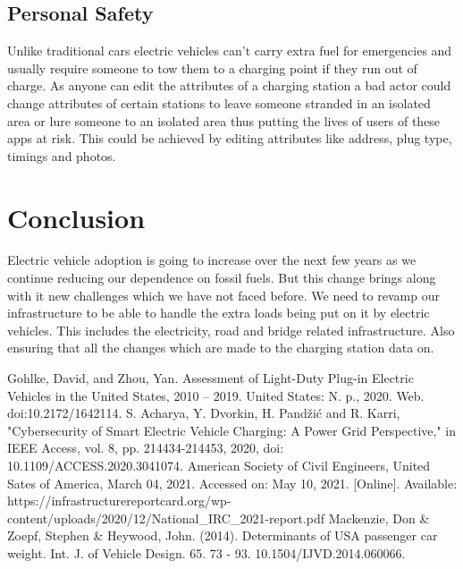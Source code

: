 \documentclass[conference]{IEEEtran}
\begin{document}
\subsection{Personal Safety}
Unlike traditional cars electric vehicles can’t carry extra fuel for emergencies and usually require someone to tow them to a charging point if they run out of charge. As anyone can edit the attributes of a charging station a bad actor could change attributes of certain stations to leave someone stranded in an isolated area or lure someone to an isolated area thus putting the lives of users of these apps at risk. This could be achieved by editing attributes like address, plug type, timings and photos.

\section{Conclusion}
Electric vehicle adoption is going to increase over the next few years as we continue reducing our dependence on fossil fuels. But this change brings along with it new challenges which we have not faced before. We need to revamp our infrastructure to be able to handle the extra loads being put on it by electric vehicles. This includes the electricity, road and bridge related infrastructure. Also ensuring that all the changes which are made to the charging station data on.

\begin{thebibliography}{00}
 Gohlke, David, and Zhou, Yan. Assessment of Light-Duty Plug-in Electric Vehicles in the United States, 2010 – 2019. United States: N. p., 2020. Web. doi:10.2172/1642114.
 S. Acharya, Y. Dvorkin, H. Pandžić and R. Karri, "Cybersecurity of Smart Electric Vehicle Charging: A Power Grid Perspective," in IEEE Access, vol. 8, pp. 214434-214453, 2020, doi: 10.1109/ACCESS.2020.3041074.
 American Society of Civil Engineers, United Sates of America, March 04, 2021. Accessed on: May 10, 2021. [Online]. Available: https://infrastructurereportcard.org/wp-content/uploads/2020/12/National\_IRC\_2021-report.pdf 
 Mackenzie, Don \& Zoepf, Stephen \& Heywood, John. (2014). Determinants of USA passenger car weight. Int. J. of Vehicle Design. 65. 73 - 93. 10.1504/IJVD.2014.060066.
\end{thebibliography}
\end{document}
